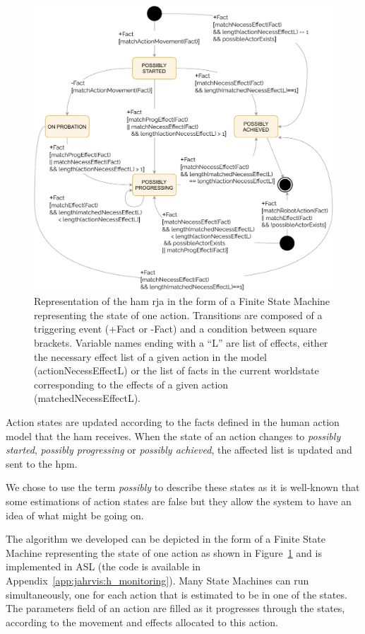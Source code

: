 \documentclass[a4paper,11pt,twoside]{StyleThese}
\begin{document}
\begin{figure}[!hbt]
	\includegraphics[width=\linewidth]{figures/chapter2/action_sm.pdf}
	\caption{Representation of the \acrfull{ham} \acrshort{rja} in the form of a Finite State Machine representing the state of one action. Transitions are composed of a triggering event (+Fact or -Fact) and a condition between square brackets. Variable names ending with a ``L'' are list of effects, either the necessary effect list of a given action in the model (actionNecessEffectL) or the list of facts in the current worldstate corresponding to the effects of a given action (matchedNecessEffectL).}
	\label{chap6:fig:action_monitoring}
\end{figure}

Action states are updated according to the facts defined in the human action model that the \acrshort{ham} receives. When the state of an action changes to \emph{possibly started}, \emph{possibly progressing} or \emph{possibly achieved}, the affected list is updated and sent to the \acrshort{hpm}. 

We chose to use the term \emph{possibly} to describe these states as it is well-known that some estimations of action states are false but they allow the system to have an idea of what might be going on.

The algorithm we developed can be depicted in the form of a Finite State Machine representing the state of one action as shown in Figure~\ref{chap6:fig:action_monitoring} and is implemented in ASL (the code is available in Appendix~\ref{app:jahrvis:h_monitoring}). Many State Machines can run simultaneously, one for each action that is estimated to be in one of the states. The parameters field of an action are filled as it progresses through the states, according to the movement and effects allocated to this action. 
\end{document}
